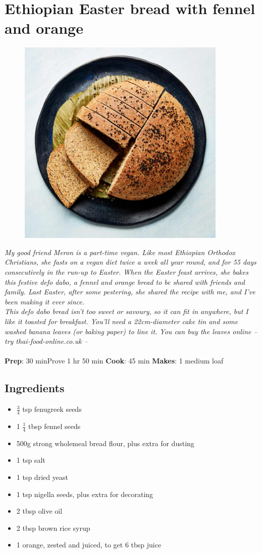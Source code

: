 \documentclass{book}
\begin{document}
\section{Ethiopian Easter bread with fennel and orange}
\begin{figure}
\centering\includegraphics[width=10cm,height=10cm,keepaspectratio]{Recipe_Pictures/Ethiopian_Easter_bread_with_fennel_and_orange.png}
\end{figure}
\emph{My good friend Meron is a part-time vegan. Like most Ethiopian Orthodox Christians, she fasts on a vegan diet twice a week all year round, and for 55 days consecutively in the run-up to Easter. When the Easter feast arrives, she bakes this festive defo dabo, a fennel and orange bread to be shared with friends and family. Last Easter, after some pestering, she shared the recipe with me, and I’ve been making it ever since.\\ 
This defo dabo bread isn’t too sweet or savoury, so it can fit in anywhere, but I like it toasted for breakfast. You’ll need a 22cm-diameter cake tin and some washed banana leaves (or baking paper) to line it. You can buy the leaves online – try thai-food-online.co.uk – }\\\\ 
\textbf{Prep}: 30 minProve 1 hr 50 min
\textbf{Cook}: 45 min
\textbf{Makes}: 1 medium loaf
\subsection*{Ingredients}
\begin{itemize}
\item $\frac{3}{4}$ tsp fenugreek seeds 
\item 1 $\frac{1}{4}$ tbsp fennel seeds 
\item 500g strong wholemeal bread flour, plus extra for dusting
\item 1 tsp salt
\item 1 tsp dried yeast 
\item 1 tsp nigella seeds, plus extra for decorating
\item 2 tbsp olive oil 
\item 2 tbsp brown rice syrup
\item 1 orange, zested and juiced, to get 6 tbsp juice 
\end{itemize}
\end{document}
